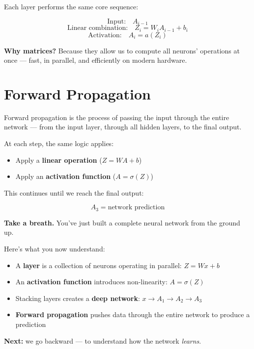 \documentclass[11pt]{article}
\begin{document}
Each layer performs the same core sequence:

\begin{defbox}[title=Layer Computation --- General Rule]
\[
\text{Input:} \quad A_{i-1}
\]
\[
\text{Linear combination:} \quad Z_i = W_i A_{i-1} + b_i
\]
\[
\text{Activation:} \quad A_i = a(Z_i)
\]
\end{defbox}

\textbf{Why matrices?}  
Because they allow us to compute all neurons’ operations at once —  
fast, in parallel, and efficiently on modern hardware.

\section{Forward Propagation}

Forward propagation is the process of passing the input through the entire network —  
from the input layer, through all hidden layers, to the final output.

At each step, the same logic applies:

\begin{itemize}
    \item Apply a \textbf{linear operation} ($Z = W A + b$)
    \item Apply an \textbf{activation function} ($A = \sigma(Z)$)
\end{itemize}

This continues until we reach the final output:

\[
A_3 = \text{network prediction}
\]

\newpage

\begin{resultbox}[title=Checkpoint --- What We've Built So Far]
\textbf{Take a breath.} You've just built a complete neural network from the ground up.

Here's what you now understand:
\begin{itemize}
  \item A \textbf{layer} is a collection of neurons operating in parallel: $Z = Wx + b$
  \item An \textbf{activation function} introduces non-linearity: $A = \sigma(Z)$
  \item Stacking layers creates a \textbf{deep network}: $x \to A_1 \to A_2 \to A_3$
  \item \textbf{Forward propagation} pushes data through the entire network to produce a prediction
\end{itemize}

\textbf{Next:} we go backward --- to understand how the network \textit{learns}.
\end{resultbox}
\end{document}
